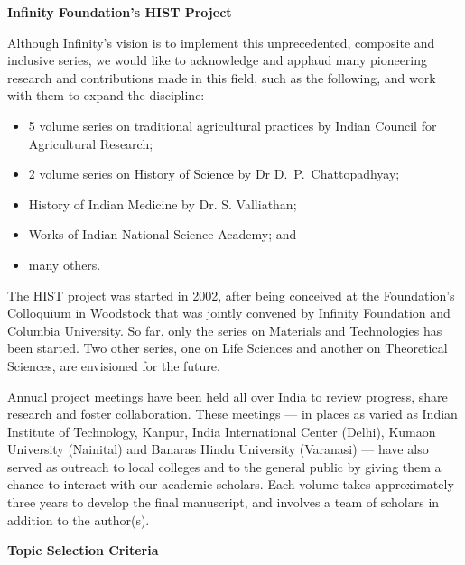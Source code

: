 \textbf{Infinity Foundation’s HIST Project}

Although Infinity’s vision is to implement this unprecedented, composite and inclusive series, we would like to acknowledge and applaud many pioneering research and contributions made in this field, such as the following, and work with them to expand the discipline:
\begin{itemize}
\itemsep=0pt
\item 5 volume series on traditional agricultural practices by Indian Council for Agricultural Research;

\item 2 volume series on History of Science by Dr D.~P.~Chattopadhyay;

\item History of Indian Medicine by Dr. S. Valliathan;

\item Works of Indian National Science Academy; and 

\item many others.

\end{itemize}

The HIST project was started in 2002, after being conceived at the Foundation’s Colloquium in Woodstock that was jointly convened by Infinity Foundation and Columbia University. So far, only the series on Materials and Technologies has been started. Two other series, one on Life Sciences and another on Theoretical Sciences, are envisioned for the future.

Annual project meetings have been held all over India to review progress, share research and foster collaboration. These meetings — in places as varied as Indian Institute of Technology, Kanpur, India International Center (Delhi), Kumaon University (Nainital) and Banaras Hindu University (Varanasi) — have also served as outreach to local colleges and to the general public by giving them a chance to interact with our academic scholars. Each volume takes approximately three years to develop the final manuscript, and involves a team of scholars in addition to the author(s).

\textbf{Topic Selection Criteria}

